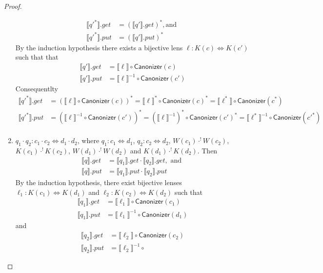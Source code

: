 \documentclass[acmsmall,review,anonymous]{acmart}
\newcommand{\kw}[1]{\ensuremath{\mathsf{#1}}}
\newcommand{\canonizer}{\ensuremath{\kw{Canonizer}}}
\begin{document}
\begin{proof}
\begin{enumerate}
\begin{align*}
\llbracket {q'}^* \rrbracket.get &= (\llbracket q' \rrbracket.get)^*, \text{
and }\\
\llbracket {q'}^* \rrbracket.put &= (\llbracket q' \rrbracket.put)^*
\end{align*}
By the induction hypothesis there exists a bijective lens $\ell : K(c)
\Leftrightarrow K(c')$ such that
that
\begin{align*}
\llbracket q' \rrbracket.get &= \llbracket \ell \rrbracket \circ
\canonizer(c)\\
\llbracket q' \rrbracket.put &= {\llbracket \ell \rrbracket}^{-1} \circ
\canonizer(c')
\end{align*}
Consequentlty
\begin{align*}
\llbracket {q'}^* \rrbracket.get &= (\llbracket \ell \rrbracket \circ
\canonizer(c))^* = \llbracket \ell \rrbracket^* \circ
\canonizer(c)^* = \llbracket \ell^* \rrbracket \circ
\canonizer(c^*)\\
\llbracket {q'}^* \rrbracket.put &= (\llbracket \ell \rrbracket^{-1} \circ
\canonizer(c'))^* = (\llbracket \ell \rrbracket^{-1})^* \circ
\canonizer(c')^* = \llbracket \ell^* \rrbracket^{-1} \circ
\canonizer(c'^*)\\
\end{align*}
\item
$q_1 \cdot q_2: c_1 \cdot c_2 \Leftrightarrow d_1 \cdot d_2$, where $q_1 : c_1
\Leftrightarrow d_1 $,  $q_2 : c_2 \Leftrightarrow d_2$, $W(c_1)
\cdot^! W(c_2)$, $K(c_1) \cdot^! K(c_2)$, $W(d_1) \cdot^! W(d_2)$ and $
K(d_1) \cdot^! K(d_2)$. Then
\begin{align*}
\llbracket q \rrbracket.get &= \llbracket q_1 \rrbracket.get \cdot \llbracket
q_2 \rrbracket.get, \text{ and }\\
\llbracket q \rrbracket.put &= \llbracket q_1 \rrbracket.put \cdot \llbracket
q_2 \rrbracket.put
\end{align*}
By the induction hypothesis, there exist bijective lenses $\ell_1 : K(c_1)
\Leftrightarrow K(d_1)$ and $\ell_2 : K(c_2) \Leftrightarrow K(d_2)$ such that
\begin{align*}
\llbracket q_1 \rrbracket.get &= \llbracket \ell_1 \rrbracket \circ
\canonizer(c_1)\\
\llbracket q_1 \rrbracket.put &= {\llbracket \ell_1 \rrbracket}^{-1} \circ
\canonizer(d_1)
\end{align*}
and
\begin{align*}
\llbracket q_2 \rrbracket.get &= \llbracket \ell_2 \rrbracket \circ
\canonizer(c_2)\\
\llbracket q_2 \rrbracket.put &= {\llbracket \ell_2 \rrbracket}^{-1} \circ

\end{align*}
\end{enumerate}
\end{proof}
\end{document}
